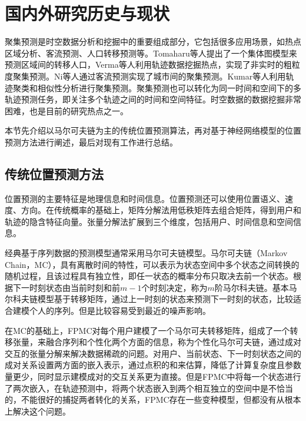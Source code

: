\documentclass[master]{thesis-uestc}
\begin{document}
\section{国内外研究历史与现状}
聚集预测是时空数据分析和挖掘中的重要组成部分，它包括很多应用场景，如热点区域分析、客流预测、人口转移预测等。Tomaharu等人提出了一个集体图模型来预测区域间的转移人口，Verma等人利用轨迹数据挖掘热点，实现了非实时的粗粒度聚集预测。Ni等人通过客流预测实现了城市间的聚集预测。Kumar等人利用轨迹聚类和相似性分析进行聚集预测。聚集预测也可以转化为同一时间和空间下的多轨迹预测任务，即关注多个轨迹之间的时间和空间特征。时空数据的数据挖掘非常困难，也是目前的研究热点之一。

本节先介绍以马尔可夫链为主的传统位置预测算法，再对基于神经网络模型的位置预测方法进行阐述，最后对现有工作进行总结。

\subsection{传统位置预测方法}
位置预测的主要特征是地理信息和时间信息。位置预测还可以使用位置语义、速度、方向。在传统概率的基础上，矩阵分解法用低秩矩阵去组合矩阵，得到用户和轨迹的隐含特征向量。张量分解法扩展到三个维度，包括用户、时间信息和空间信息。

经典基于序列数据的预测模型通常采用马尔可夫链模型。马尔可夫链（Markov Chain，MC），具有离散时间的特性，可以表示为状态空间中多个状态之间转换的随机过程，且该过程具有独立性，即任一状态的概率分布只取决去前一个状态。根据下一时刻状态由当前时刻和前$m-1$个时刻决定，称为$m$阶马尔科夫链。基本马尔科夫链模型基于转移矩阵，通过上一时刻的状态来预测下一时刻的状态，比较适合建模个人的序列。但是比较容易受到最近的噪声影响。

在MC的基础上，FPMC对每个用户建模了一个马尔可夫转移矩阵，组成了一个转移张量，来融合序列和个性化两个方面的信息，称为个性化马尔可夫链，通过成对交互的张量分解来解决数据稀疏的问题。对用户、当前状态、下一时刻状态之间的成对关系设置两方面的嵌入表示，通过点积的和来估算，降低了计算复杂度且参数量更少，同时显示建模成对的交互关系更为直接。但是FPMC中将每一个状态进行了两次嵌入，在轨迹预测中，将两个状态嵌入到两个相互独立的空间中是不恰当的，不能很好的捕捉两者转化的关系，FPMC存在一些变种模型，但都没有从根本上解决这个问题。
\end{document}
